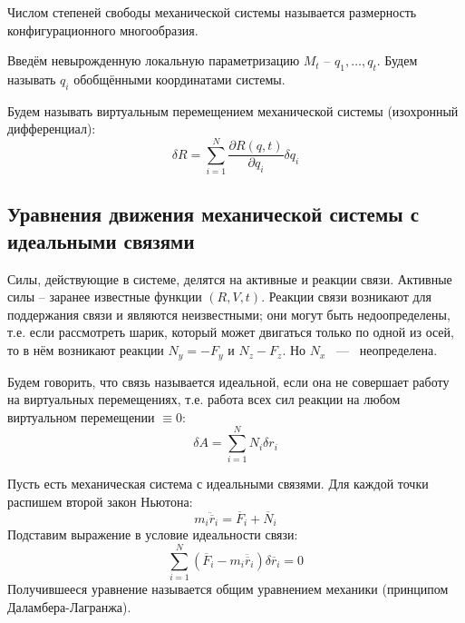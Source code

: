 \begin{definition}
    Числом степеней свободы механической системы называется размерность конфигурационного многообразия.
\end{definition}
\begin{definition}
    Введём невырожденную локальную параметризацию $M_t$ -- $q_1, \ldots, q_t$. Будем называть $q_i$ обобщёнными координатами системы.
\end{definition}
\begin{definition}
    Будем называть виртуальным перемещением механической системы (изохронный дифференциал): \[
    \delta R = \sum\limits_{i = 1}^N \dfrac{\partial R(q, t)}{\partial q_i} \delta q_i
    \]
\end{definition}

\subsection{Уравнения движения механической системы с идеальными связями}
\begin{definition}
    Силы, действующие в системе, делятся на активные и реакции связи. Активные силы -- заранее известные функции $(R, V, t)$. Реакции связи возникают для поддержания связи и являются неизвестными; они могут быть недоопределены, т.е. если рассмотреть шарик, который может двигаться только по одной из осей, то в нём возникают реакции $N_y = -F_y$ и $N_z -F_z$. Но $N_x$ ~--- ~неопределена.
\end{definition}
\begin{definition}
    Будем говорить, что связь называется идеальной, если она не совершает работу на виртуальных перемещениях, т.е.  работа всех сил реакции на любом виртуальном перемещении $\equiv 0$: \[\delta A = \sum\limits_{i = 1}^N N_i\delta r_i\]
\end{definition}
\begin{definition}
    Пусть есть механическая система с идеальными связями.
    Для каждой точки распишем второй закон Ньютона: \[ m_i\ddot{\overline{r}}_i = \overline{F}_i + \overline{N}_i\]
    Подставим выражение в условие идеальности связи: \[
        \sum\limits_{i = 1}^N (\overline{F}_i - m_i \ddot{\overline{r}_i})\delta \overline{r}_i = 0
    \]
    Получившееся уравнение называется общим уравнением механики (принципом Даламбера-Лагранжа).
\end{definition}

